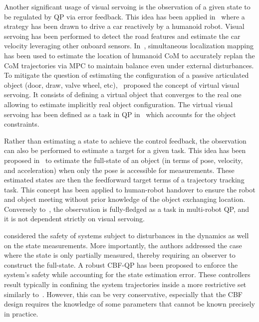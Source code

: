 Another significant usage of visual servoing is the observation of a given state to be regulated by QP via error feedback.  
This idea has been applied in~\cite{paolillo2014humanoids,paolillo2018fieldRobotics} where a strategy has been drawn to drive a car reactively by a humanoid robot. Visual servoing has been performed to detect the road features and estimate the car velocity leveraging other onboard sensors. In~\cite{tanguy2019icra}, simultaneous localization mapping has been used to estimate the location of humanoid CoM to accurately replan the CoM trajectories via MPC to maintain balance even under external disturbances.  
To mitigate the question of estimating the configuration of a passive articulated object (door, draw, valve wheel, etc),~\cite{paolillo2017sii} proposed the concept of virtual visual servoing. It consists of defining a virtual object that converges to the real one allowing to estimate implicitly real object configuration. The virtual visual servoing has been defined as a task in QP in~\cite{paolillo2018fieldRobotics} which accounts for the object constraints. 

Rather than estimating a state to achieve the control feedback, the observation can also be performed to estimate a target for a given task. This idea has been proposed in~\cite{djeha2022arxiv} to estimate the full-state of an object (in terms of pose, velocity, and acceleration) when only the pose is accessible for measurements. These estimated states are then the feedforward target terms of a trajectory tracking task. This concept has been applied to human-robot handover to ensure the robot and object meeting without prior knowledge of the object exchanging location. Conversely to~\cite{paolillo2018ral}, the observation is fully-fledged as a task in multi-robot QP, and it is not dependent strictly on visual servoing. 

\cite{agrawal2022csl} considered the safety of systems subject to disturbances in the dynamics as well on the state measurements. More importantly, the authors addressed the case where the state is only partially measured, thereby requiring an observer to construct the full-state. A robust CBF-QP has been proposed to enforce the system's safety while accounting for the state estimation error. These controllers result typically in confining the system trajectories inside a more restrictive set similarly to~\cite{kolathaya2019csl,alan2022csl}. However, this can be very conservative, especially that the CBF design requires the knowledge of some parameters that cannot be known precisely in practice. 

